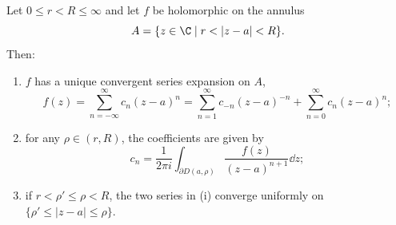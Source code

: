 \begin{theorem}
    Let $0 \leq r < R \leq \infty$ and let $f$ be holomorphic on the annulus
    $$
    A = \{z \in \C \mid r < |z - a| < R\}.
    $$
    Then:
    \begin{enumerate}[label=(\roman*)]
        \item $f$ has a unique convergent series expansion on $A$,
        $$
        f(z) = \sum_{n = -\infty}^{\infty} c_n (z - a)^n = \sum_{n = 1}^{\infty} c_{-n}(z - a)^{-n} + \sum_{n = 0}^{\infty} c_n (z - a)^n;
        $$
        \item for any $\rho \in (r, R)$, the coefficients are given by
        $$
        c_n = \frac{1}{2 \pi i}\int_{\partial D(a, \rho)} \frac{f(z)}{(z - a)^{n + 1}} \dd z;
        $$
        \item if $r < \rho' \leq \rho < R$, the two series in (i) converge uniformly on $\{\rho' \leq |z - a| \leq \rho\}$.
    \end{enumerate}
\end{theorem}
